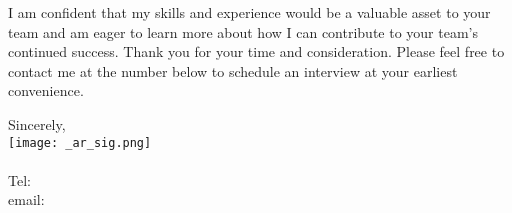 \documentclass[letterpaper]{article}
\begin{document}
I am confident that my skills and experience would be a valuable asset to your team and
am eager to learn more about how I can contribute to your team's continued success.
Thank you for your time and consideration.
Please feel free to contact me at the number below to schedule an interview at your earliest convenience.

Sincerely,\\
    \hspace{1em}
    \texttt{[image: \_ar\_sig.png]} \\
    \CVsigname \\
    \small
    Tel: \CVphone \\
    email: \CVemail
\end{document}
